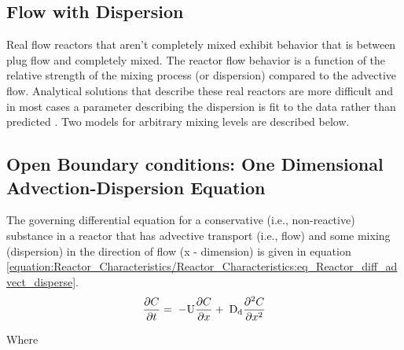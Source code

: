 \documentclass[letterpaper,10pt,english]{sphinxmanual}
\begin{document}
\subsection{Flow with Dispersion}
\label{\detokenize{Reactor_Characteristics/Reactor_Characteristics:flow-with-dispersion}}
Real flow reactors that aren’t completely mixed exhibit behavior that is between plug flow and completely mixed. The reactor flow behavior is a function of the relative strength of the mixing process (or dispersion) compared to the advective flow. Analytical solutions that describe these real reactors are more difficult and in most cases a parameter describing the dispersion is fit to the data rather than predicted . Two models for arbitrary mixing levels are described below.


\subsection{Open Boundary conditions: One Dimensional Advection-Dispersion Equation}
\label{\detokenize{Reactor_Characteristics/Reactor_Characteristics:open-boundary-conditions-one-dimensional-advection-dispersion-equation}}
The governing differential equation for a conservative (i.e., non-reactive) substance in a reactor that has advective transport (i.e., flow) and some mixing (dispersion) in the direction of flow (x - dimension) is given in equation \eqref{equation:Reactor_Characteristics/Reactor_Characteristics:eq_Reactor_diff_advect_disperse}.
\begin{equation}\label{equation:Reactor_Characteristics/Reactor_Characteristics:eq_Reactor_diff_advect_disperse}
\begin{split}\frac{\partial C}{\partial t} ={\rm \; -U}\frac{\partial C}{\partial x} +{\rm \; D}_{{\rm d}} \frac{\partial ^{2} C}{\partial x^{2}}\end{split}
\end{equation}\begin{description}
\item[{Where}] \leavevmode
{}

\end{description}
\end{document}
